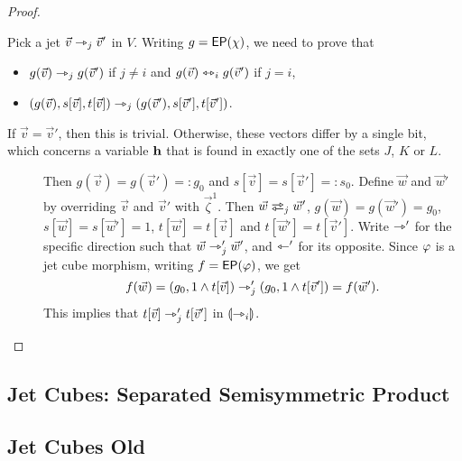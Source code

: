 \documentclass[a4paper]{article}
\begin{document}
\begin{proof}
\begin{itemize}
		Pick a jet $\vec v \rightarrowtriangle_j \vec v'$ in $V$. Writing $g = \mathsf{EP}(\chi)$, we need to prove that
		\begin{itemize}
			\item $g(\vec v) \rightarrowtriangle_j g(\vec v')$ if $j \neq i$ and $g(\vec v) \leftrightarrowtriangle_i g(\vec v')$ if $j = i$,
			\item $(g(\vec v), s[\vec v], t[\vec v]) \rightarrowtriangle_j (g(\vec v'), s[\vec v'], t[\vec v'])$.
		\end{itemize}
		If $\vec v = \vec v'$, then this is trivial.
		Otherwise, these vectors differ by a single bit, which concerns a variable $\mathbf{h}$ that is found in exactly one of the sets $J$, $K$ or $L$.
		\begin{description}
			\item[] Then $g(\vec v) = g(\vec v') =: g_0$ and $s[\vec v] = s[\vec v'] =: s_0$.
			Define $\vec w$ and $\vec w'$ by overriding $\vec v$ and $\vec v'$ with $\vec \zeta^1$.
			Then $\vec w \infrajet_j \vec w'$, $g(\vec w) = g(\vec w') = g_0$, $s[\vec w] = s[\vec w'] = 1$, $t[\vec w] = t[\vec v]$ and $t[\vec w'] = t[\vec v']$.
			Write $\rightarrowtriangle'$ for the specific direction such that $\vec w \rightarrowtriangle'_j \vec w'$, and $\leftarrowtriangle'$ for its opposite.
			Since $\varphi$ is a jet cube morphism, writing $f = \mathsf{EP}(\varphi)$, we get
			\[
				f(\vec w) = (g_0, 1 \wedge t[\vec v]) \rightarrowtriangle'_j (g_0, 1 \wedge t[\vec v']) = f(\vec w').
			\]
			This implies that $t[\vec v] \rightarrowtriangle'_j t[\vec v']$ in ${\llparenthesis \rightarrowtriangle_i \rrparenthesis}$.
		\end{description}
	\end{itemize}
\end{proof}


\subsection{Jet Cubes: Separated Semisymmetric Product}

\subsection{Jet Cubes Old}
\end{document}
